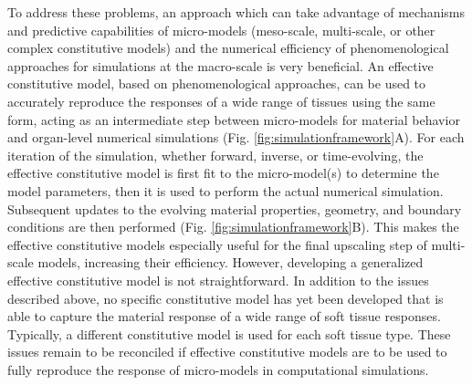     To address these problems, an approach which can take advantage of mechanisms and predictive capabilities of micro-models (meso-scale, multi-scale, or other complex constitutive models) and the numerical efficiency of phenomenological approaches for simulations at the macro-scale is very beneficial. An effective constitutive model, based on phenomenological approaches, can be used to accurately reproduce the responses of a wide range of tissues using the same form, acting as an intermediate step between micro-models for material behavior and organ-level numerical simulations (Fig. \ref{fig:simulationframework}A). For each iteration of the simulation, whether forward, inverse, or time-evolving, the effective constitutive model is first fit to the micro-model(s) to determine the model parameters, then it is used to perform the actual numerical simulation. Subsequent updates to the evolving material properties, geometry, and boundary conditions are then performed (Fig. \ref{fig:simulationframework}B). This makes the effective constitutive models especially useful for the final upscaling step of multi-scale models, increasing their efficiency. However, developing a generalized effective constitutive model is not straightforward. In addition to the issues described above, no specific constitutive model has yet been developed that is able to capture the material response of a wide range of soft tissue responses. Typically, a different constitutive model is used for each soft tissue type. These issues remain to be reconciled if effective constitutive models are to be used to fully reproduce the response of micro-models in computational simulations. 
    
